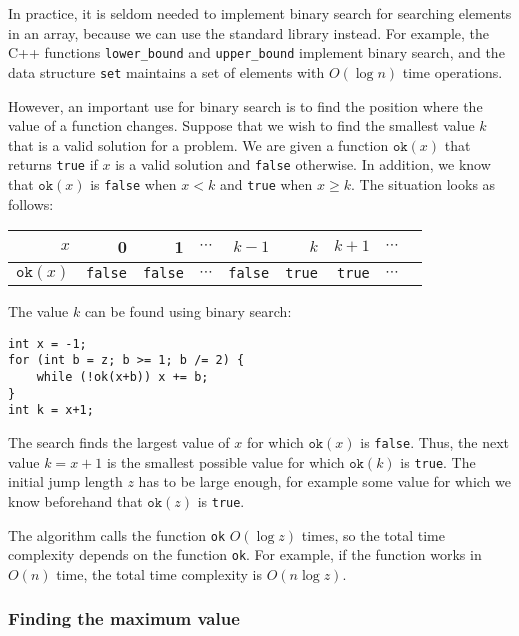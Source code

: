 In practice, it is seldom needed to implement
binary search for searching elements in an array,
because we can use the standard library instead.
For example, the C++ functions \texttt{lower\_bound}
and \texttt{upper\_bound} implement binary search,
and the data structure \texttt{set} maintains a
set of elements with $O(\log n)$ time operations.

However, an important use for binary search is
to find the position where the value of a function changes.
Suppose that we wish to find the smallest value $k$
that is a valid solution for a problem.
We are given a function $\texttt{ok}(x)$
that returns \texttt{true} if $x$ is a valid solution
and \texttt{false} otherwise.
In addition, we know that $\texttt{ok}(x)$ is \texttt{false}
when $x<k$ and \texttt{true} when $x \ge k$.
The situation looks as follows:

\begin{center}
\begin{tabular}{r|rrrrrrrr}
$x$ & 0 & 1 & $\cdots$ & $k-1$ & $k$ & $k+1$ & $\cdots$ \\
\hline
$\texttt{ok}(x)$ & \texttt{false} & \texttt{false}
& $\cdots$ & \texttt{false} & \texttt{true} & \texttt{true} & $\cdots$ \\
\end{tabular}
\end{center}

\noindent
The value $k$ can be found using binary search:

\begin{lstlisting}
int x = -1;
for (int b = z; b >= 1; b /= 2) {
    while (!ok(x+b)) x += b;
}
int k = x+1;
\end{lstlisting}

The search finds the largest value of $x$ for which
$\texttt{ok}(x)$ is \texttt{false}.
Thus, the next value $k=x+1$
is the smallest possible value for which
$\texttt{ok}(k)$ is \texttt{true}.
The initial jump length $z$ has to be
large enough, for example some value
for which we know beforehand that $\texttt{ok}(z)$ is \texttt{true}.

The algorithm calls the function \texttt{ok}
$O(\log z)$ times, so the total time complexity
depends on the function \texttt{ok}.
For example, if the function works in $O(n)$ time,
the total time complexity is $O(n \log z)$.

\subsubsection{Finding the maximum value}


